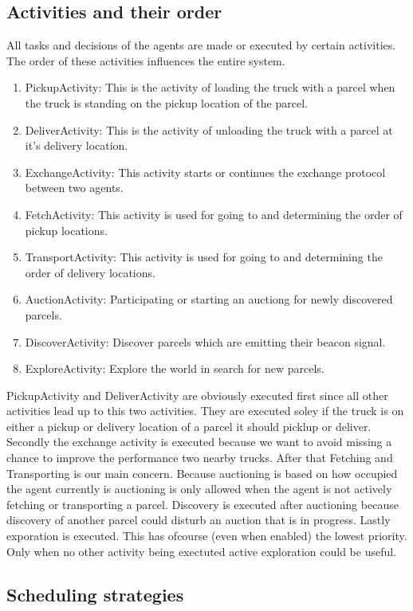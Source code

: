 \documentclass[../main.tex]{subfiles}
\begin{document}
\subsection{Activities and their order}
All tasks and decisions of the agents are made or executed by certain activities.
The order of these activities influences the entire system. 
\begin{enumerate}
	\item PickupActivity: This is the activity of loading the truck with a parcel when the truck is standing on the pickup location of the parcel.
	\item DeliverActivity: This is the activity of unloading the truck with a parcel at it's delivery location. 
	\item ExchangeActivity: This activity starts or continues the exchange protocol between two agents. 
	\item FetchActivity: This activity is used for going to and determining the order of pickup locations. 
	\item TransportActivity: This activity is used for going to and determining the order of delivery locations.   
	\item AuctionActivity: Participating or starting an auctiong for newly discovered parcels.
	\item DiscoverActivity: Discover parcels which are emitting their beacon signal. 
	\item ExploreActivity: Explore the world in search for new parcels.  
\end{enumerate}
PickupActivity and DeliverActivity are obviously executed first since all other activities lead up to this two activities. 
They are executed soley if the truck is on either a pickup or delivery location of a parcel it should picklup or deliver.
Secondly the exchange activity is executed because we want to avoid missing a chance to improve the performance two nearby trucks.
After that Fetching and Transporting is our main concern.
Because auctioning is based on how occupied the agent currently is auctioning is only allowed when the agent is not actively fetching or transporting a parcel.
Discovery is executed after auctioning because discovery of another parcel could disturb an auction that is in progress.
Lastly exporation is executed. This has ofcourse (even when enabled) the lowest priority.
Only when no other activity being exectuted active exploration could be useful.

\subsection{Scheduling strategies}
\end{document}
